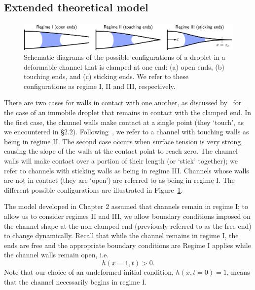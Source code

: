 \subsection{Extended theoretical model}\label{S:Ch4:Geometric:Model}
\begin{figure}[t]
\includegraphics[width = \textwidth]{regime_schematics}
\caption{Schematic diagrams of the possible configurations of a droplet in a deformable channel that is clamped at one end: (a) open ends, (b) touching ends, and (c) sticking ends. We refer to these configurations as regime I, II and III, respectively. }\label{fig:Ch4:Geometric:RegimeSchematics}
\end{figure}

There are two cases for walls in contact with one another, as discussed by~\cite{Taroni2012JFM} for the case of an immobile droplet that remains in contact with the clamped end. In the first case, the channel walls make contact at a single point (they `touch', as we encountered in \S2.2). Following~\cite{Taroni2012JFM}, we refer to a channel with touching walls as being in regime II. The second case occurs when surface tension is very strong, causing the slope of the walls at the contact point to reach zero. The channel walls will make contact over a portion of their length (or `stick' together); we refer to channels with sticking walls as being in regime III. Channels whose walls are not in contact (they are `open') are referred to as being in regime I. The different possible configurations are illustrated in Figure~\ref{fig:Ch4:Geometric:RegimeSchematics}.

The model developed in Chapter 2 assumed that channels remain in regime I; to allow us to consider regimes II and III, we allow boundary conditions imposed on the channel shape at the non-clamped end (previously referred to as the free end) to change dynamically. Recall that while the channel remains in regime I, the ends are free and the appropriate boundary conditions are
Regime I applies while the channel walls remain open, i.e.
\begin{equation}\label{E:Ch4:Geometric:Model:Regime1_necessary_conditions}
h(x = 1,t) > 0.
\end{equation}
Note that our choice of an undeformed initial condition, $h(x,t = 0) = 1$, means that the channel necessarily begins in regime I.

